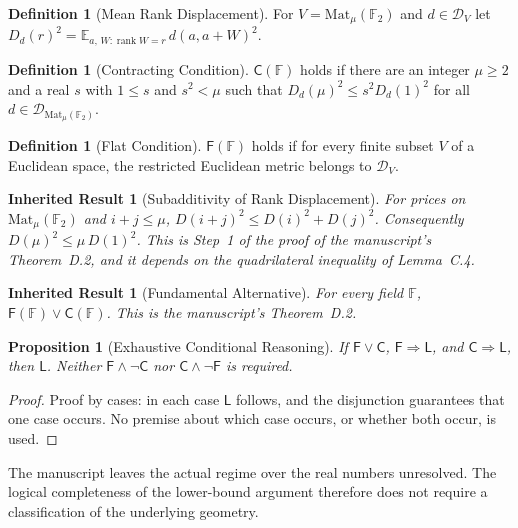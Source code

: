 \documentclass[11pt,letterpaper]{report}
\theoremstyle{plain}
\newtheorem{proposition}[theorem]{Proposition}
\newtheorem{inherited}[theorem]{Inherited Result}
\theoremstyle{definition}
\newtheorem{definition}[theorem]{Definition}
\theoremstyle{remark}
\begin{document}
\begin{definition}[Mean Rank Displacement]
For $V=\mathrm{Mat}_\mu(\mathbb F_2)$ and $d\in\mathcal D_V$ let $D_d(r)^2=\mathbb E_{a,\,W:\operatorname{rank}W=r}\,d(a,a+W)^2$.
\end{definition}

\begin{definition}[Contracting Condition]
$\mathsf C(\mathbb F)$ holds if there are an integer $\mu\ge2$ and a real $s$ with $1\le s$ and $s^2<\mu$ such that $D_d(\mu)^2\le s^2D_d(1)^2$ for all $d\in\mathcal D_{\mathrm{Mat}_\mu(\mathbb F_2)}$.
\end{definition}

\begin{definition}[Flat Condition]
$\mathsf F(\mathbb F)$ holds if for every finite subset $V$ of a Euclidean space, the restricted Euclidean metric belongs to $\mathcal D_V$.
\end{definition}

\begin{inherited}[Subadditivity of Rank Displacement]
For prices on $\mathrm{Mat}_\mu(\mathbb F_2)$ and $i+j\le\mu$, $D(i+j)^2\le D(i)^2+D(j)^2$. Consequently $D(\mu)^2\le\mu\,D(1)^2$. This is Step~1 of the proof of the manuscript's Theorem~D.2, and it depends on the quadrilateral inequality of Lemma~C.4.
\end{inherited}

\begin{inherited}[Fundamental Alternative]\label{inh:alt}
For every field $\mathbb F$, $\mathsf F(\mathbb F)\lor\mathsf C(\mathbb F)$. This is the manuscript's Theorem~D.2.
\end{inherited}

\begin{proposition}[Exhaustive Conditional Reasoning]
If $\mathsf F\lor\mathsf C$, $\mathsf F\Rightarrow\mathsf L$, and $\mathsf C\Rightarrow\mathsf L$, then $\mathsf L$. Neither $\mathsf F\land\neg\mathsf C$ nor $\mathsf C\land\neg\mathsf F$ is required.
\end{proposition}
\begin{proof}
Proof by cases: in each case $\mathsf L$ follows, and the disjunction guarantees that one case occurs. No premise about which case occurs, or whether both occur, is used.
\end{proof}

The manuscript leaves the actual regime over the real numbers unresolved. The logical completeness of the lower-bound argument therefore does not require a classification of the underlying geometry.
\end{document}
